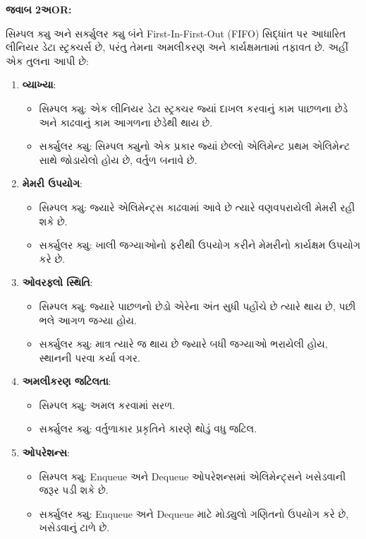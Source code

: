 \textbf{જવાબ 2અOR:}

સિમ્પલ ક્યુ અને સર્ક્યુલર ક્યુ બંને First-In-First-Out (FIFO) સિદ્ધાંત પર આધારિત
લીનિયર ડેટા સ્ટ્રક્ચર્સ છે, પરંતુ તેમના અમલીકરણ અને કાર્યક્ષમતામાં તફાવત છે. અહીં એક
તુલના આપી છે:

\begin{enumerate}
\def\labelenumi{\arabic{enumi}.}
\tightlist
\item
  \textbf{વ્યાખ્યા}:

  \begin{itemize}
  \tightlist
  \item
    સિમ્પલ ક્યુ: એક લીનિયર ડેટા સ્ટ્રક્ચર જ્યાં દાખલ કરવાનું કામ પાછળના છેડે અને
    કાઢવાનું કામ આગળના છેડેથી થાય છે.
  \item
    સર્ક્યુલર ક્યુ: સિમ્પલ ક્યુનો એક પ્રકાર જ્યાં છેલ્લો એલિમેન્ટ પ્રથમ એલિમેન્ટ સાથે
    જોડાયેલો હોય છે, વર્તુળ બનાવે છે.
  \end{itemize}
\item
  \textbf{મેમરી ઉપયોગ}:

  \begin{itemize}
  \tightlist
  \item
    સિમ્પલ ક્યુ: જ્યારે એલિમેન્ટ્સ કાઢવામાં આવે છે ત્યારે વણવપરાયેલી મેમરી રહી શકે છે.
  \item
    સર્ક્યુલર ક્યુ: ખાલી જગ્યાઓનો ફરીથી ઉપયોગ કરીને મેમરીનો કાર્યક્ષમ ઉપયોગ કરે છે.
  \end{itemize}
\item
  \textbf{ઓવરફ્લો સ્થિતિ}:

  \begin{itemize}
  \tightlist
  \item
    સિમ્પલ ક્યુ: જ્યારે પાછળનો છેડો એરેના અંત સુધી પહોંચે છે ત્યારે થાય છે, પછી ભલે આગળ
    જગ્યા હોય.
  \item
    સર્ક્યુલર ક્યુ: માત્ર ત્યારે જ થાય છે જ્યારે બધી જગ્યાઓ ભરાયેલી હોય, સ્થાનની પરવા
    કર્યા વગર.
  \end{itemize}
\item
  \textbf{અમલીકરણ જટિલતા}:

  \begin{itemize}
  \tightlist
  \item
    સિમ્પલ ક્યુ: અમલ કરવામાં સરળ.
  \item
    સર્ક્યુલર ક્યુ: વર્તુળાકાર પ્રકૃતિને કારણે થોડું વધુ જટિલ.
  \end{itemize}
\item
  \textbf{ઓપરેશન્સ}:

  \begin{itemize}
  \tightlist
  \item
    સિમ્પલ ક્યુ: Enqueue અને Dequeue ઓપરેશન્સમાં એલિમેન્ટ્સને ખસેડવાની જરૂર પડી શકે છે.
  \item
    સર્ક્યુલર ક્યુ: Enqueue અને Dequeue માટે મોડ્યુલો ગણિતનો ઉપયોગ કરે છે, ખસેડવાનું
    ટાળે છે.
  \end{itemize}
\end{enumerate}

